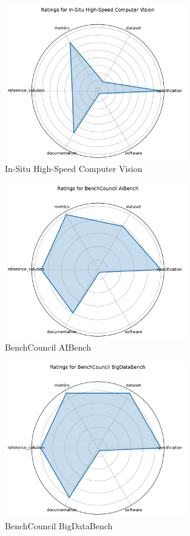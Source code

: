 \documentclass{article}
\begin{document}
\begin{figure}[h!]
  \centering
  \includegraphics[width=0.7\textwidth]{In-Situ High-Speed Computer Vision_radar.pdf}
  \caption{In-Situ High-Speed Computer Vision}
\end{figure}

\begin{figure}[h!]
  \centering
  \includegraphics[width=0.7\textwidth]{BenchCouncil AIBench_radar.pdf}
  \caption{BenchCouncil AIBench}
\end{figure}

\begin{figure}[h!]
  \centering
  \includegraphics[width=0.7\textwidth]{BenchCouncil BigDataBench_radar.pdf}
  \caption{BenchCouncil BigDataBench}
\end{figure}
\end{document}

